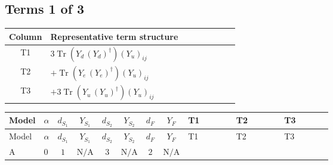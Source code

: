 \documentclass[8pt]{article}
\begin{document}
\begin{landscape}
\subsection*{Terms 1 of 3}
\begin{center}
\begin{tabular}{@{}c >{\raggedright\arraybackslash}p{0.82\linewidth}@{}}
\toprule
Column & Representative term structure \\
\midrule
T1 & \(\displaystyle 3 \operatorname{Tr}\!\left({Y_d}\,\left({Y_d}\right)^{\dagger}\right) \left({Y_u}\right)_{ij}\) \\
\midrule
T2 & \(\displaystyle +\operatorname{Tr}\!\left({Y_e}\,\left({Y_e}\right)^{\dagger}\right) \left({Y_u}\right)_{ij}\) \\
\midrule
T3 & \(\displaystyle +3 \operatorname{Tr}\!\left({Y_u}\,\left({Y_u}\right)^{\dagger}\right) \left({Y_u}\right)_{ij}\) \\
\midrule
\bottomrule
\end{tabular}
\end{center}
\smallskip
\tiny
\begin{longtable}{@{}llcccccc >{\raggedright\arraybackslash}p{0.21\linewidth} >{\raggedright\arraybackslash}p{0.21\linewidth} >{\raggedright\arraybackslash}p{0.21\linewidth}@{}}
\toprule
Model & $\alpha$ & $d_{S_1}$ & $Y_{S_1}$ & $d_{S_2}$ & $Y_{S_2}$ & $d_F$ & $Y_F$ & T1 & T2 & T3 \\
\midrule
\endfirsthead
\toprule
Model & $\alpha$ & $d_{S_1}$ & $Y_{S_1}$ & $d_{S_2}$ & $Y_{S_2}$ & $d_F$ & $Y_F$ & T1 & T2 & T3 \\
\midrule
\endhead
A & $0$ & $1$ & $\text{N/A}$ & $3$ & $\text{N/A}$ & $2$ & $\text{N/A}$ & \scriptsize\adjustbox{max width=\linewidth}{$\begin{gathered} 3 \operatorname{Tr}\!\left({Y_d}\,\left({Y_d}\right)^{\dagger}\right) \left({Y_u}\right)_{ij}\end{gathered}$} & \scriptsize\adjustbox{max width=\linewidth}{$\begin{gathered} +\operatorname{Tr}\!\left({Y_e}\,\left({Y_e}\right)^{\dagger}\right) \left({Y_u}\right)_{ij}\end{gathered}$} & \scriptsize\adjustbox{max width=\linewidth}{$\begin{gathered} +3 \operatorname{Tr}\!\left({Y_u}\,\left({Y_u}\right)^{\dagger}\right) \left({Y_u}\right)_{ij}\end{gathered}$} \\
\midrule

\end{longtable}
\end{landscape}
\end{document}
